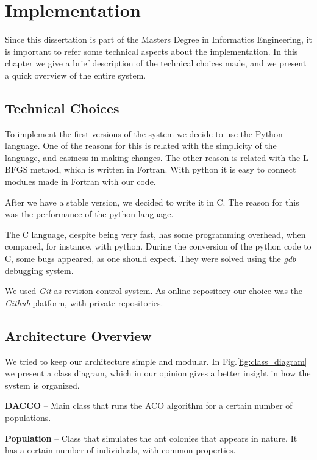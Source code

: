\chapter{Implementation}

Since this dissertation is part of the Masters Degree in Informatics Engineering, it is important to refer some technical aspects about the implementation. In this chapter we give a brief description of the technical choices made, and we present a quick overview of the entire system.

\section{Technical Choices}

To implement the first versions of the system we decide to use the Python language. One of the reasons for this is related with the simplicity of the language, and easiness in making changes. The other reason is related with the L-BFGS method, which is written in Fortran. With python it is easy to connect modules made in Fortran with our code.

After we have a stable version, we decided to write it in C. The reason for this was the performance of the python language. 

The C language, despite being very fast, has some programming overhead, when compared, for instance, with python. During the conversion of the python code to C, some bugs appeared, as one should expect. They were solved using the \emph{gdb} debugging system.

We used \emph{Git} as revision control system. As online repository our choice was the \emph{Github} platform, with private repositories.

\section{Architecture Overview}
We tried to keep our architecture simple and modular. In Fig.\ref{fig:class_diagram} we present a class diagram, which in our opinion gives a better insight in how the system is organized.

\pagebreak
\textbf{DACCO} – Main class that runs the ACO algorithm for a certain number of populations.

\textbf{Population} – Class that simulates the ant colonies that appears in nature. It has a certain number of individuals, with common properties.

